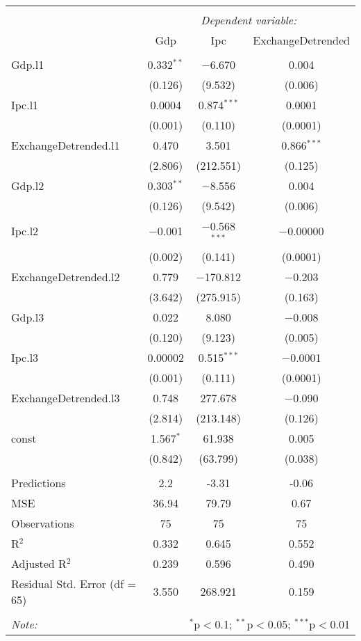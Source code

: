 
\begin{table}[H] \centering 
  \caption{} 
  \label{} 
\begin{tabular}{@{\extracolsep{5pt}}lccc} 
\\[-1.8ex]\hline 
\hline \\[-1.8ex] 
 & \multicolumn{3}{c}{\textit{Dependent variable:}} \\ 
\cline{2-4} 
 & Gdp & Ipc & ExchangeDetrended \\ 
\hline \\[-1.8ex] 
 Gdp.l1 & 0.332$^{**}$ & $-$6.670 & 0.004 \\ 
  & (0.126) & (9.532) & (0.006) \\ 
  Ipc.l1 & 0.0004 & 0.874$^{***}$ & 0.0001 \\ 
  & (0.001) & (0.110) & (0.0001) \\ 
  ExchangeDetrended.l1 & 0.470 & 3.501 & 0.866$^{***}$ \\ 
  & (2.806) & (212.551) & (0.125) \\ 
  Gdp.l2 & 0.303$^{**}$ & $-$8.556 & 0.004 \\ 
  & (0.126) & (9.542) & (0.006) \\ 
  Ipc.l2 & $-$0.001 & $-$0.568$^{***}$ & $-$0.00000 \\ 
  & (0.002) & (0.141) & (0.0001) \\ 
  ExchangeDetrended.l2 & 0.779 & $-$170.812 & $-$0.203 \\ 
  & (3.642) & (275.915) & (0.163) \\ 
  Gdp.l3 & 0.022 & 8.080 & $-$0.008 \\ 
  & (0.120) & (9.123) & (0.005) \\ 
  Ipc.l3 & 0.00002 & 0.515$^{***}$ & $-$0.0001 \\ 
  & (0.001) & (0.111) & (0.0001) \\ 
  ExchangeDetrended.l3 & 0.748 & 277.678 & $-$0.090 \\ 
  & (2.814) & (213.148) & (0.126) \\ 
  const & 1.567$^{*}$ & 61.938 & 0.005 \\ 
  & (0.842) & (63.799) & (0.038) \\ 
 \hline \\[-1.8ex] 
Predictions & 2.2 & -3.31 & -0.06 \\ 
MSE & 36.94 & 79.79 & 0.67 \\ 
Observations & 75 & 75 & 75 \\ 
R$^{2}$ & 0.332 & 0.645 & 0.552 \\ 
Adjusted R$^{2}$ & 0.239 & 0.596 & 0.490 \\ 
Residual Std. Error (df = 65) & 3.550 & 268.921 & 0.159 \\ 
\hline 
\hline \\[-1.8ex] 
\textit{Note:}  & \multicolumn{3}{r}{$^{*}$p$<$0.1; $^{**}$p$<$0.05; $^{***}$p$<$0.01} \\ 
\end{tabular} 
\end{table} 
